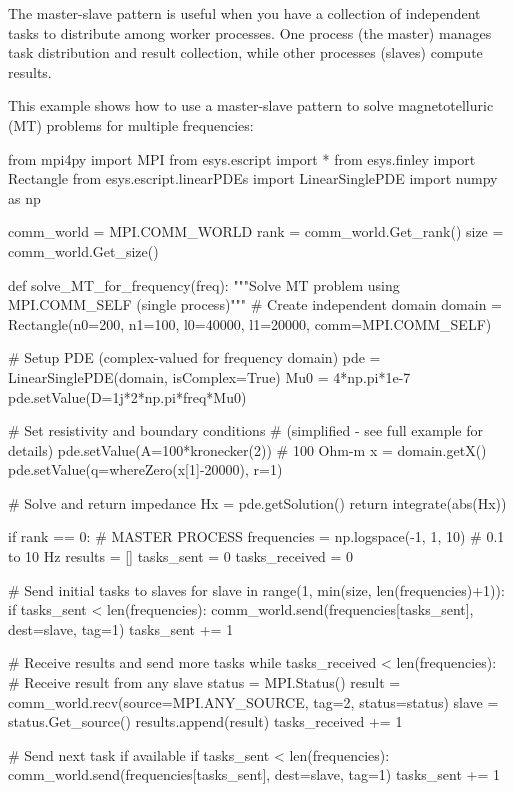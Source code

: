 The master-slave pattern is useful when you have a collection of independent tasks to distribute among worker processes. One process (the master) manages task distribution and result collection, while other processes (slaves) compute results.

This example shows how to use a master-slave pattern to solve magnetotelluric (MT) problems for multiple frequencies:

\begin{python}
from mpi4py import MPI
from esys.escript import *
from esys.finley import Rectangle
from esys.escript.linearPDEs import LinearSinglePDE
import numpy as np

comm_world = MPI.COMM_WORLD
rank = comm_world.Get_rank()
size = comm_world.Get_size()

def solve_MT_for_frequency(freq):
    """Solve MT problem using MPI.COMM_SELF (single process)"""
    # Create independent domain
    domain = Rectangle(n0=200, n1=100, l0=40000, l1=20000,
                      comm=MPI.COMM_SELF)

    # Setup PDE (complex-valued for frequency domain)
    pde = LinearSinglePDE(domain, isComplex=True)
    Mu0 = 4*np.pi*1e-7
    pde.setValue(D=1j*2*np.pi*freq*Mu0)

    # Set resistivity and boundary conditions
    # (simplified - see full example for details)
    pde.setValue(A=100*kronecker(2))  # 100 Ohm-m
    x = domain.getX()
    pde.setValue(q=whereZero(x[1]-20000), r=1)

    # Solve and return impedance
    Hx = pde.getSolution()
    return integrate(abs(Hx))

if rank == 0:
    # MASTER PROCESS
    frequencies = np.logspace(-1, 1, 10)  # 0.1 to 10 Hz
    results = []
    tasks_sent = 0
    tasks_received = 0

    # Send initial tasks to slaves
    for slave in range(1, min(size, len(frequencies)+1)):
        if tasks_sent < len(frequencies):
            comm_world.send(frequencies[tasks_sent], dest=slave, tag=1)
            tasks_sent += 1

    # Receive results and send more tasks
    while tasks_received < len(frequencies):
        # Receive result from any slave
        status = MPI.Status()
        result = comm_world.recv(source=MPI.ANY_SOURCE, tag=2,
                                status=status)
        slave = status.Get_source()
        results.append(result)
        tasks_received += 1

        # Send next task if available
        if tasks_sent < len(frequencies):
            comm_world.send(frequencies[tasks_sent], dest=slave, tag=1)
            tasks_sent += 1


\end{python}

